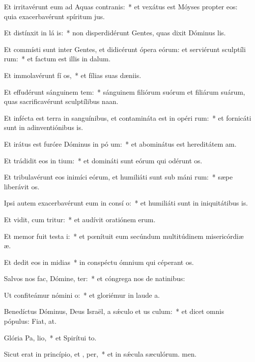 \item Et irritavérunt eum ad Aquas contranis:~* et vexátus est Móyses propter eos: quia exacerbavérunt spíritum jus.
\item Et distínxit in lá is:~* non disperdidérunt Gentes, quas dixit Dóminus lis.
\item Et commísti sunt inter Gentes, et didicérunt ópera eórum: et serviérunt sculptíli rum:~* et factum est illis in dalum.
\item Et immolavérunt fí os,~* et fílias suas dæniis.
\item Et effudérunt sánguinem tem:~* sánguinem filiórum suórum et filiárum suárum, quas sacrificavérunt sculptílibus naan.
\item Et infécta est terra in sanguínibus, et contamináta est in opéri rum:~* et fornicáti sunt in adinventiónibus is.
\item Et irátus est furóre Dóminus in pó um:~* et abominátus est hereditátem am.
\item Et trádidit eos in  tium:~* et domináti sunt eórum qui odérunt os.
\item Et tribulavérunt eos inimíci eórum, et humiliáti sunt sub máni rum:~* sæpe liberávit os.
\item Ipsi autem exacerbavérunt eum in consí o:~* et humiliáti sunt in iniquitátibus is.
\item Et vidit, cum tritur:~* et audívit oratiónem erum.
\item Et memor fuit testa i:~* et pœnítuit eum secúndum multitúdinem misericórdiæ æ.
\item Et dedit eos in midias~* in conspéctu ómnium qui céperant os.
\item Salvos nos fac, Dómine,  ter:~* et cóngrega nos de natinibus:
\item Ut confiteámur nómini  o:~* et gloriémur in laude a.
\item Benedíctus Dóminus, Deus Israël, a sǽculo et us  culum:~* et dicet omnis pópulus: Fiat, at.
\item Glória Pa,  lio,~* et Spirítui to.
\item Sicut erat in princípio, et ,  per,~* et in sǽcula sæculórum. men.
